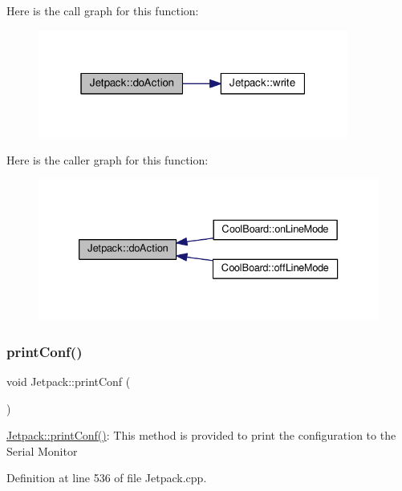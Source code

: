 Here is the call graph for this function\+:\nopagebreak
\begin{figure}[H]
\begin{center}
\leavevmode
\includegraphics[width=289pt]{df/d1d/class_jetpack_a9e703197093094b963f9ad57817495b8_cgraph}
\end{center}
\end{figure}
Here is the caller graph for this function\+:\nopagebreak
\begin{figure}[H]
\begin{center}
\leavevmode
\includegraphics[width=333pt]{df/d1d/class_jetpack_a9e703197093094b963f9ad57817495b8_icgraph}
\end{center}
\end{figure}
\mbox{\label{class_jetpack_ac54a7bb4f9166bee32052253d9b1d306}} 
\subsubsection{\texorpdfstring{print\+Conf()}{printConf()}}
{\footnotesize\ttfamily void Jetpack\+::print\+Conf (\begin{DoxyParamCaption}{ }\end{DoxyParamCaption})}

\hyperlink{class_jetpack_ac54a7bb4f9166bee32052253d9b1d306}{Jetpack\+::print\+Conf()}\+: This method is provided to print the configuration to the Serial Monitor 

Definition at line 536 of file Jetpack.\+cpp.


